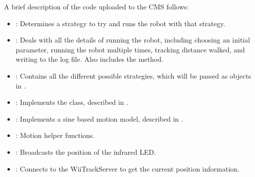 A brief description of the code uploaded to the CMS follows:

\begin{itemize}
\item {}: Determines a strategy to try and runs the robot
  with that strategy.
\item {}: Deals with all the details of running the robot,
  including choosing an initial parameter, running the robot multiple times, 
  tracking distance walked, and writing to the log file. Also includes the
   method.
\item {}: Contains all the different possible strategies, which
  will be passed as objects in . 
\item {}: Implements the  class, described in
  .
\item {}: Implements a sine based motion model,
  described in .
\item {}: Motion helper functions.
\item {}: Broadcasts the position of the infrared LED.
\item {}: Connects to the WiiTrackServer to get the current position information.
\end{itemize}

